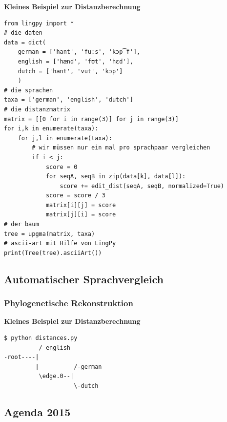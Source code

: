 \textbf{Kleines Beispiel zur Distanzberechnung}

\begin{verbatim}
from lingpy import *
# die daten
data = dict(
    german = ['hant', 'fuːs', 'kɔp͡f'],
    english = ['hænd', 'fʊt', 'hɛd'],
    dutch = ['hant', 'vut', 'kɔp']
    )
# die sprachen
taxa = ['german', 'english', 'dutch']
# die distanzmatrix
matrix = [[0 for i in range(3)] for j in range(3)]
for i,k in enumerate(taxa):
    for j,l in enumerate(taxa):
        # wir müssen nur ein mal pro sprachpaar vergleichen
        if i < j:
            score = 0
            for seqA, seqB in zip(data[k], data[l]):
                score += edit_dist(seqA, seqB, normalized=True)
            score = score / 3
            matrix[i][j] = score
            matrix[j][i] = score
# der baum
tree = upgma(matrix, taxa)
# ascii-art mit Hilfe von LingPy
print(Tree(tree).asciiArt())
\end{verbatim}

\subsection{\texorpdfstring{{Automatischer
Sprachvergleich}}{Automatischer Sprachvergleich}}

\subsubsection{\texorpdfstring{{Phylogenetische
Rekonstruktion}}{Phylogenetische Rekonstruktion}}

\textbf{Kleines Beispiel zur Distanzberechnung}

\begin{verbatim}
$ python distances.py
          /-english
-root----|
         |          /-german
          \edge.0--|
                    \-dutch
\end{verbatim}

\subsection{\texorpdfstring{{Agenda 2015}}{Agenda 2015}}

